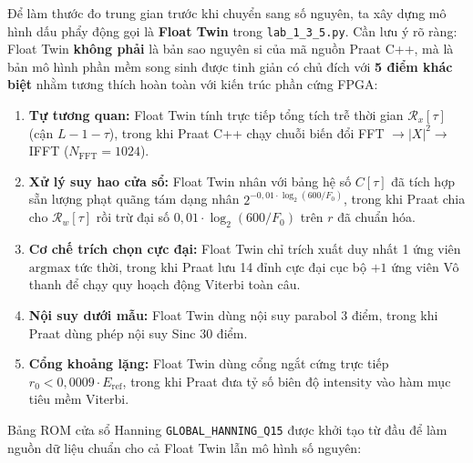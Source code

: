 \documentclass[11pt,a4paper]{article}
\begin{document}
Để làm thước đo trung gian trước khi chuyển sang số nguyên, ta xây dựng mô hình dấu phẩy động gọi là \textbf{Float Twin} trong \texttt{lab\_1\_3\_5.py}. Cần lưu ý rõ ràng: Float Twin \textbf{không phải} là bản sao nguyên si của mã nguồn Praat C++, mà là bản mô hình phần mềm song sinh được tinh giản có chủ đích với \textbf{5 điểm khác biệt} nhằm tương thích hoàn toàn với kiến trúc phần cứng FPGA:
\begin{enumerate}
    \setlength{\itemsep}{0.5pt}
    \item \textbf{Tự tương quan:} Float Twin tính trực tiếp tổng tích trễ thời gian $\mathcal{R}_x[\tau]$ (cận $L - 1 - \tau$), trong khi Praat C++ chạy chuỗi biến đổi FFT $\to |X|^2 \to$ IFFT ($N_{\text{FFT}} = 1024$).
    \item \textbf{Xử lý suy hao cửa sổ:} Float Twin nhân với bảng hệ số $C[\tau]$ đã tích hợp sẵn lượng phạt quãng tám dạng nhân $2^{-0{,}01 \cdot \log_2(600/F_0)}$, trong khi Praat chia cho $\mathcal{R}_w[\tau]$ rồi trừ đại số $0{,}01 \cdot \log_2(600/F_0)$ trên $r$ đã chuẩn hóa.
    \item \textbf{Cơ chế trích chọn cực đại:} Float Twin chỉ trích xuất duy nhất 1 ứng viên $\text{argmax}$ tức thời, trong khi Praat lưu 14 đỉnh cực đại cục bộ $+ 1$ ứng viên Vô thanh để chạy quy hoạch động Viterbi toàn câu.
    \item \textbf{Nội suy dưới mẫu:} Float Twin dùng nội suy parabol 3 điểm, trong khi Praat dùng phép nội suy Sinc 30 điểm.
    \item \textbf{Cổng khoảng lặng:} Float Twin dùng cổng ngắt cứng trực tiếp $r_0 < 0{,}0009 \cdot E_{\text{ref}}$, trong khi Praat đưa tỷ số biên độ $\text{intensity}$ vào hàm mục tiêu mềm Viterbi.
\end{enumerate}

Bảng ROM cửa sổ Hanning \texttt{GLOBAL\_HANNING\_Q15} được khởi tạo từ đầu để làm nguồn dữ liệu chuẩn cho cả Float Twin lẫn mô hình số nguyên:
\end{document}
